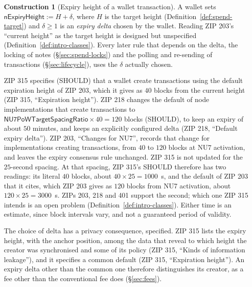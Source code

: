 \documentclass[11pt,a4paper]{article}
\theoremstyle{definition}
\newtheorem{construction}[theorem]{Construction}
\begin{document}
\begin{construction}[Expiry height of a wallet transaction]
A wallet sets $\mathsf{nExpiryHeight} := H + \delta$, where $H$ is the
target height (Definition~\ref{def:spend-target}) and $\delta \ge 1$ is an
\emph{expiry delta} chosen by the wallet. Reading ZIP 203's ``current
height'' as the target height is designed but unspecified
(Definition~\ref{def:intro-classes}). Every later rule that depends on the
delta, the locking of notes (\S\ref{sec:spend-locks}) and the polling and
re-sending of transactions (\S\ref{sec:lifecycle}), uses the $\delta$
actually chosen.
\end{construction}

ZIP 315 specifies (SHOULD) that a wallet create transactions using the
default expiration height of ZIP 203, which it gives as $40$ blocks from
the current height (ZIP 315, ``Expiration height''). ZIP 218 changes the
default of node implementations that create transactions to
$\mathsf{NU7PoWTargetSpacingRatio} \times 40 = 120$ blocks (SHOULD), to keep
an expiry of about $50$ minutes, and keeps an explicitly configured delta
(ZIP 218, ``Default expiry delta''). ZIP 203, ``Changes for NU7'', records
that change for implementations creating transactions, from $40$ to $120$
blocks at NU7 activation, and leaves the expiry consensus rule unchanged.
ZIP 315 is not updated for the $25$-second spacing. At that spacing, ZIP
315's SHOULD therefore has two readings: its literal $40$ blocks, about $40
\times 25 = 1000$~s, and the default of ZIP 203 that it cites, which ZIP 203
gives as $120$ blocks from NU7 activation, about $120 \times 25 = 3000$~s.
ZIPs 203, 218 and 401 support the second; which one ZIP 315 intends is an
open problem
(Definition~\ref{def:intro-classes}). Either time is an estimate, since
block intervals vary, and not a guaranteed period of validity.

The choice of delta has a privacy consequence, specified. ZIP 315 lists the
expiry height, with the anchor position, among the data that reveal to which
height the creator was synchronised and some of its policy (ZIP 315, ``Kinds
of information leakage''), and it specifies a common default (ZIP 315,
``Expiration height''). An expiry delta other than the common one therefore
distinguishes its creator, as a fee other than the conventional fee does
(\S\ref{sec:fees}).
\end{document}
